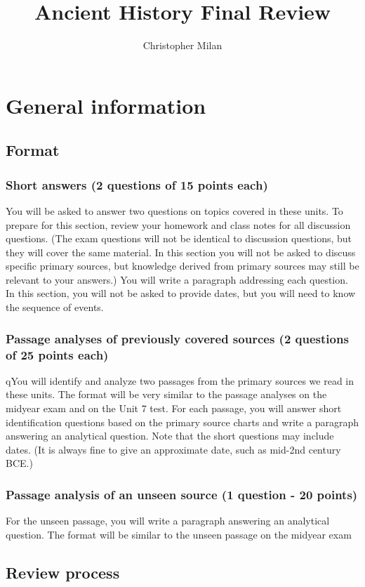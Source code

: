 \documentclass{article}
\title{Ancient History Final Review}
\author{Christopher Milan}
\begin{document}
\maketitle
\setcounter{section}{-1}
\section{General information}
\subsection{Format}
\subsubsection{Short answers (2 questions of 15 points each)}
You will be asked to answer two questions on topics covered in these units.  To prepare
for this section,  review your homework and class notes for all discussion questions. (The
exam questions will not be identical to discussion questions, but they will cover the
same material. In this section you will not be asked to discuss specific primary sources,
but knowledge derived from primary sources may still be relevant to your answers.) You
will write a paragraph addressing each question. In this section, you will not be asked to
provide dates, but you will need to know the sequence of events.
\subsubsection{Passage analyses of previously covered sources  (2 questions of 25 points each)}
qYou will identify and analyze two passages from the primary sources we read in these
units. The format will be very similar to the passage analyses on the midyear exam and
on the Unit 7 test. For each passage, you will answer short identification questions based
on the primary source charts and write a paragraph answering an analytical question.
Note that the short questions may include dates. (It is always fine to give an approximate
date, such as mid-2nd century BCE.)
\subsubsection{Passage analysis of an unseen source (1 question - 20 points)}
   For the unseen passage, you will write a paragraph answering an analytical question.
   The format will be similar to the unseen passage on the midyear exam
\subsection{Review process}
\end{document}
